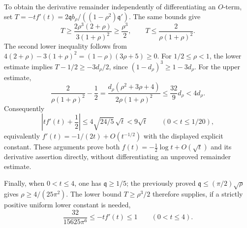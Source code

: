 \documentclass[11pt,a4paper]{article}
\begin{document}
To obtain the derivative remainder independently of differentiating
an $O$-term, set $T=-tf'(t)=2\mathfrak q b_\rho/((1-\rho^2)\mathfrak q')$.
The same bounds give
\[
 T\ge\frac{2\rho^3(2+\rho)}{3(1+\rho)^2}
 \ge\frac{\rho^3}{2},
 \qquad T\le\frac{2}{\rho(1+\rho)^2}.
\]
The second lower inequality follows from
$4(2+\rho)-3(1+\rho)^2=(1-\rho)(3\rho+5)\ge0$.
For $1/2\le\rho<1$, the lower estimate implies
$T-1/2\ge-3d_\rho/2$, since $(1-d_\rho)^3\ge1-3d_\rho$.
For the upper estimate,
\[
 \frac{2}{\rho(1+\rho)^2}-\frac12
 =\frac{d_\rho(\rho^2+3\rho+4)}{2\rho(1+\rho)^2}
 \le\frac{32}{9}d_\rho<4d_\rho.
\]
Consequently
\[
 \boxed{
 \left|t f'(t)+\frac12\right|
 \le4\sqrt{24/5}\,\sqrt t<9\sqrt t
 \qquad(0<t\le1/20),}
\]
equivalently $f'(t)=-1/(2t)+O(t^{-1/2})$ with the displayed
explicit constant. These arguments prove both
$f(t)=-\tfrac12\log t+O(\sqrt t)$ and its derivative assertion
directly, without differentiating an unproved remainder estimate.

Finally, when $0<t\le4$, one has $\mathfrak q\ge1/5$; the previously proved
$\mathfrak q\le(\pi/2)\sqrt\rho$ gives
$\rho\ge4/(25\pi^2)$. The lower bound $T\ge\rho^3/2$
therefore supplies, if a strictly positive uniform lower constant is needed,
\[
 \boxed{\frac{32}{15625\pi^6}\le -t f'(t)\le1
 \qquad(0<t\le4).}
\]




\end{document}
